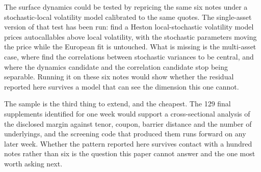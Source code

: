 The surface dynamics could be tested by repricing the same six notes under a
stochastic-local volatility model calibrated to the same quotes. The
single-asset version of that test has been run: \citet{Farkas2022} find a
Heston local-stochastic volatility model prices autocallables above local
volatility, with the stochastic parameters moving the price while the European
fit is untouched. What is missing is the multi-asset case, where
\citet{DeCol2017} find the correlations between stochastic variances to be
central, and where the dynamics candidate and the correlation candidate stop
being separable. Running it on these six notes would show whether the residual
reported here survives a model that can see the dimension this one cannot.

The sample is the third thing to extend, and the cheapest. The 129 final
supplements identified for one week would support a cross-sectional analysis of
the disclosed margin against tenor, coupon, barrier distance and the number of
underlyings, and the screening code that produced them runs forward on any
later week. Whether the pattern reported here survives contact with a hundred
notes rather than six is the question this paper cannot answer and the one most
worth asking next.

